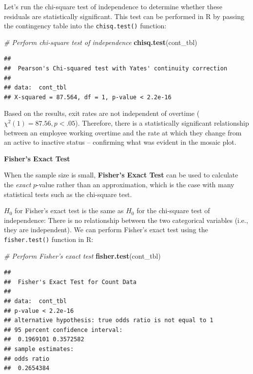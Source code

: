 \documentclass[]{book}
\newenvironment{Shaded}{\begin{snugshade}}{\end{snugshade}}
\newcommand{\CommentTok}[1]{\textcolor[rgb]{0.56,0.35,0.01}{\textit{#1}}}
\newcommand{\KeywordTok}[1]{\textcolor[rgb]{0.13,0.29,0.53}{\textbf{#1}}}
\newcommand{\NormalTok}[1]{#1}
\begin{document}
Let's run the chi-square test of independence to determine whether these residuals are statistically significant. This test can be performed in R by passing the contingency table into the \texttt{chisq.test()} function:

\begin{Shaded}
\begin{Highlighting}[]
\CommentTok{# Perform chi-square test of independence}
\KeywordTok{chisq.test}\NormalTok{(cont_tbl)}
\end{Highlighting}
\end{Shaded}

\begin{verbatim}
## 
##  Pearson's Chi-squared test with Yates' continuity correction
## 
## data:  cont_tbl
## X-squared = 87.564, df = 1, p-value < 2.2e-16
\end{verbatim}

Based on the results, exit rates are not independent of overtime (\({\chi}^2(1) = 87.56, p < .05\)). Therefore, there is a statistically significant relationship between an employee working overtime and the rate at which they change from an active to inactive status -- confirming what was evident in the mosaic plot.

\textbf{Fisher's Exact Test}

When the sample size is small, \textbf{Fisher's Exact Test} can be used to calculate the \emph{exact} \(p\)-value rather than an approximation, which is the case with many statistical tests such as the chi-square test.

\(H_0\) for Fisher's exact test is the same as \(H_0\) for the chi-square test of independence: There is no relationship between the two categorical variables (i.e., they are independent). We can perform Fisher's exact test using the \texttt{fisher.test()} function in R:

\begin{Shaded}
\begin{Highlighting}[]
\CommentTok{# Perform Fisher's exact test}
\KeywordTok{fisher.test}\NormalTok{(cont_tbl)}
\end{Highlighting}
\end{Shaded}

\begin{verbatim}
## 
##  Fisher's Exact Test for Count Data
## 
## data:  cont_tbl
## p-value < 2.2e-16
## alternative hypothesis: true odds ratio is not equal to 1
## 95 percent confidence interval:
##  0.1969101 0.3572582
## sample estimates:
## odds ratio 
##  0.2654384
\end{verbatim}
\end{document}
